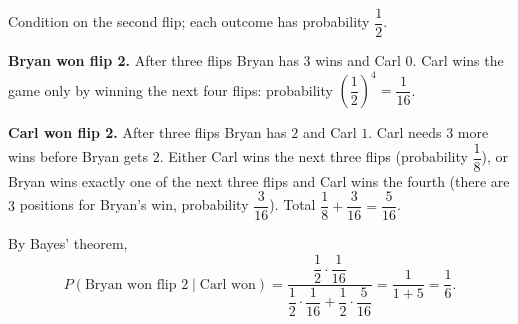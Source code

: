 Condition on the second flip; each outcome has probability $\dfrac{1}{2}$.

\textbf{Bryan won flip 2.} After three flips Bryan has $3$ wins and Carl $0$. Carl wins the game only by winning the next four flips: probability $\left(\dfrac{1}{2}\right)^4=\dfrac{1}{16}$.

\textbf{Carl won flip 2.} After three flips Bryan has $2$ and Carl $1$. Carl needs $3$ more wins before Bryan gets $2$. Either Carl wins the next three flips (probability $\dfrac{1}{8}$), or Bryan wins exactly one of the next three flips and Carl wins the fourth (there are $3$ positions for Bryan's win, probability $\dfrac{3}{16}$). Total $\dfrac{1}{8}+\dfrac{3}{16}=\dfrac{5}{16}$.

By Bayes' theorem,
\[
P(\text{Bryan won flip 2}\mid\text{Carl won})=\dfrac{\dfrac{1}{2}\cdot\dfrac{1}{16}}{\dfrac{1}{2}\cdot\dfrac{1}{16}+\dfrac{1}{2}\cdot\dfrac{5}{16}}=\dfrac{1}{1+5}=\boxed{\dfrac{1}{6}}.
\]
